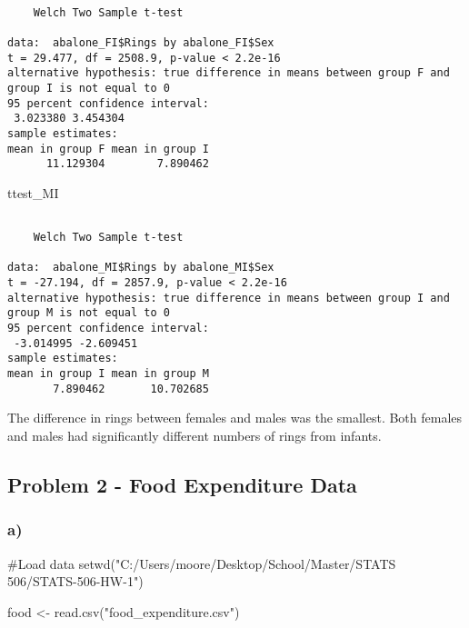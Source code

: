 \documentclass[
  letterpaper,
  DIV=11,
  numbers=noendperiod]{scrartcl}
\newenvironment{Shaded}{\begin{snugshade}}{\end{snugshade}}
\newcommand{\CommentTok}[1]{\textcolor[rgb]{0.37,0.37,0.37}{#1}}
\newcommand{\FunctionTok}[1]{\textcolor[rgb]{0.28,0.35,0.67}{#1}}
\newcommand{\NormalTok}[1]{\textcolor[rgb]{0.00,0.23,0.31}{#1}}
\newcommand{\OtherTok}[1]{\textcolor[rgb]{0.00,0.23,0.31}{#1}}
\newcommand{\StringTok}[1]{\textcolor[rgb]{0.13,0.47,0.30}{#1}}
\begin{document}
\begin{verbatim}

    Welch Two Sample t-test

data:  abalone_FI$Rings by abalone_FI$Sex
t = 29.477, df = 2508.9, p-value < 2.2e-16
alternative hypothesis: true difference in means between group F and group I is not equal to 0
95 percent confidence interval:
 3.023380 3.454304
sample estimates:
mean in group F mean in group I 
      11.129304        7.890462 
\end{verbatim}

\begin{Shaded}
\begin{Highlighting}[]
\NormalTok{ttest\_MI}
\end{Highlighting}
\end{Shaded}

\begin{verbatim}

    Welch Two Sample t-test

data:  abalone_MI$Rings by abalone_MI$Sex
t = -27.194, df = 2857.9, p-value < 2.2e-16
alternative hypothesis: true difference in means between group I and group M is not equal to 0
95 percent confidence interval:
 -3.014995 -2.609451
sample estimates:
mean in group I mean in group M 
       7.890462       10.702685 
\end{verbatim}

The difference in rings between females and males was the smallest. Both
females and males had significantly different numbers of rings from
infants.

\subsection{Problem 2 - Food Expenditure
Data}\label{problem-2---food-expenditure-data}

\subsubsection{a)}\label{a-1}

\begin{Shaded}
\begin{Highlighting}[]
\CommentTok{\#Load data}
\FunctionTok{setwd}\NormalTok{(}\StringTok{"C:/Users/moore/Desktop/School/Master/STATS 506/STATS{-}506{-}HW{-}1"}\NormalTok{)}

\NormalTok{food }\OtherTok{\textless{}{-}} \FunctionTok{read.csv}\NormalTok{(}\StringTok{"food\_expenditure.csv"}\NormalTok{)}
\end{Highlighting}
\end{Shaded}
\end{document}

